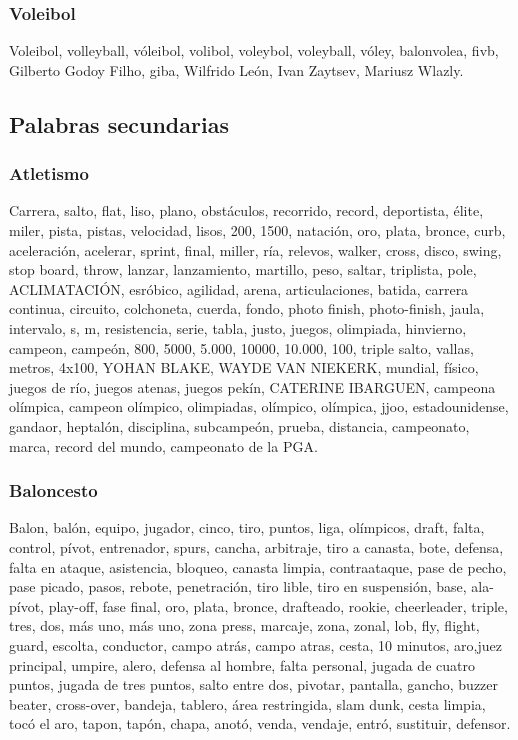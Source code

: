 \documentclass[../all.tex]{subfiles}
\begin{document}
    \subsubsection{Voleibol}
    Voleibol, volleyball, vóleibol, volibol, voleybol, voleyball, vóley, balonvolea, fivb, Gilberto Godoy Filho, giba, Wilfrido León, Ivan Zaytsev, Mariusz Wlazly.
\newpage
\subsection{Palabras secundarias}
    \subsubsection{Atletismo}
    Carrera, salto, flat, liso, plano, obstáculos, recorrido, record, deportista, élite, miler, pista, pistas, velocidad, lisos, 200, 1500, natación, oro, plata, bronce, curb, aceleración, acelerar, sprint, final, miller, ría, relevos, walker, cross, disco, swing, stop board, throw, lanzar, lanzamiento, martillo, peso, saltar, triplista, pole, ACLIMATACIÓN, esróbico, agilidad, arena, articulaciones, batida, carrera continua, circuito, colchoneta, cuerda, fondo, photo finish, photo-finish, jaula, intervalo, s, m, resistencia, serie, tabla, justo, juegos, olimpiada, hinvierno, campeon, campeón, 800, 5000, 5.000, 10000, 10.000, 100, triple salto, vallas, metros, 4x100, YOHAN BLAKE, WAYDE VAN NIEKERK, mundial, físico, juegos de río, juegos atenas, juegos pekín, CATERINE IBARGUEN, campeona olímpica, campeon olímpico, olimpiadas, olímpico, olímpica, jjoo, estadounidense, gandaor, heptalón, disciplina, subcampeón, prueba, distancia, campeonato, marca, record del mundo, campeonato de la PGA.
    \subsubsection{Baloncesto}
    Balon, balón, equipo, jugador, cinco, tiro, puntos, liga, olímpicos, draft, falta, control, pívot, entrenador, spurs, cancha, arbitraje, tiro a canasta, bote, defensa, falta en ataque, asistencia, bloqueo, canasta limpia, contraataque, pase de pecho, pase picado, pasos, rebote, penetración, tiro lible, tiro en suspensión, base, ala-pívot, play-off, fase final, oro, plata, bronce, drafteado, rookie, cheerleader, triple, tres, dos, más uno, más uno, zona press, marcaje, zona, zonal, lob, fly, flight, guard, escolta, conductor, campo atrás, campo atras, cesta, 10 minutos, aro,juez principal, umpire, alero, defensa al hombre, falta personal, jugada de cuatro puntos, jugada de tres puntos, salto entre dos, pivotar, pantalla, gancho, buzzer beater, cross-over, bandeja, tablero, área restringida, slam dunk, cesta limpia, tocó el aro, tapon, tapón, chapa, anotó, venda, vendaje, entró, sustituir, defensor.
\end{document}

